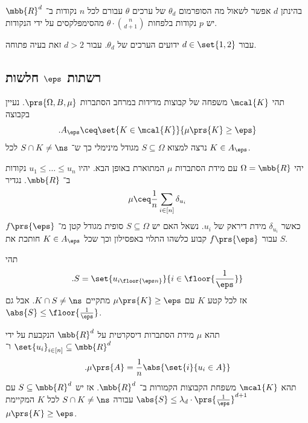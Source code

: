 \documentclass[a4paper,10pt,twoside,openany]{book}
\begin{document}
\begin{remark}
בהינתן
$d$
אפשר לשאול מה הסופרמום
$\theta_d$
של ערכים
$\theta$
עבורם לכל
$n$
נקודות ב־%
$\mbb{R}^d$
יש
$p$
נקודות בלפחות
$\theta \cdot \binom{n}{d+1}$
מהסימפלקסים על ידי הנקודות.

עבור
$d \in \set{1,2}$
ידועים הערכים של
$\theta_d$.
עבור
$d > 2$
זאת בעיה פתוחה.
\end{remark}


\subsection{רשתות
$\eps$
חלשות}

תהי
$\mcal{K}$
משפחה של קבוצות מדידות במרחב הסתברות
$\prs{\Omega, B, \mu}$.
נעיין בקבוצה
\[\text{.} A_{\eps} \ceq \set{K \in \mcal{K}}{\mu\prs{K} \geq \eps}\]
נרצה למצוא
$S \subseteq \Omega$
מגודל מינימלי כך ש־%
$S \cap K \neq \ns$
לכל
$K \in A_\eps$.

\begin{example}
יהי
$\Omega = \mbb{R}$
עם מידת הסתברות
$\mu$
המתוארת באופן הבא.
יהיו
$u_1 \leq \ldots \leq u_n$
נקודות ב־%
$\mbb{R}$.
נגדיר
\begin{align*}
\mu \ceq \frac{1}{n} \sum_{i \in [n]} \delta_{u_i}
\end{align*}
כאשר
$\delta_{u_i}$
מידת דיראק של
$u_i$.
נשאל האם יש
$S \subseteq \Omega$
סופית מגודל קטן מ־%
$f\prs{\eps}$
עבור
$f\prs{\eps}$
קבוע כלשהו התלוי באפסילון וכך שכל
$K \in A_\eps$
חותכת את
$S$.

תהי
\[\text{.} S = \set{u_{i \floor{\eps n}}}{i \in \floor{\frac{1}{\eps}}}\]
אז לכל קטע
$K$
עם
$\mu\prs{K} \geq \eps$
מתקיים
$K \cap S \neq \ns$.
אבל גם
$\abs{S} \leq \floor{\frac{1}{\eps}}$.
\end{example}

\begin{theorem}
תהא
$\mu$
מידת הסתברות דיסקרטית על
$\mbb{R}^d$
הנקבעת על ידי
$\set{u_i}_{i \in [n]} \subseteq \mbb{R}^d$
ו־%
\[\text{.} \mu\prs{A} = \frac{1}{n} \abs{\set{i}{u_i \in A}}\]
תהא
$\mcal{K}$
משפחת הקבוצות הקמורות ב־%
$\mbb{R}^d$.
אז יש
$S \subseteq \mbb{R}^d$
עם
$\abs{S} \leq \lambda_d \cdot \prs{\frac{1}{\eps}}^{d+1}$
עבורה
$S \cap K \neq \ns$
לכל
$K$
המקיימת
$\mu\prs{K} \geq \eps$.
\end{theorem}
\end{document}
